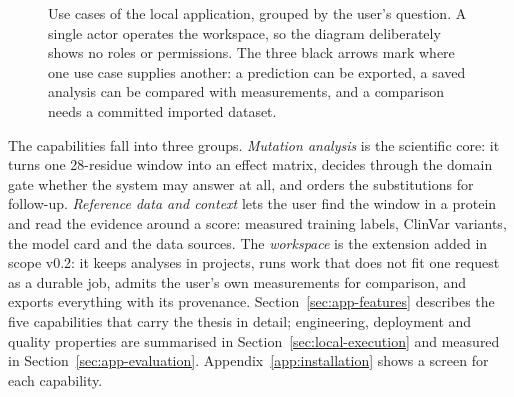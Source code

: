 \begin{figure}[htbp]
  \centering
  
  \caption[Use cases of the local application]{Use cases of the local application, grouped by the user's question. A single actor
  operates the workspace, so the diagram deliberately shows no roles or permissions. The three
  black arrows mark where one use case supplies another: a prediction can be exported, a saved
  analysis can be compared with measurements, and a comparison needs a committed imported dataset.}
  \label{fig:app-usecases}
\end{figure}

The capabilities fall into three groups. \emph{Mutation analysis} is the scientific core: it turns
one 28-residue window into an effect matrix, decides through the domain gate whether the system may
answer at all, and orders the substitutions for follow-up. \emph{Reference data and context} lets the
user find the window in a protein and read the evidence around a score: measured training labels,
ClinVar variants, the model card and the data sources. The \emph{workspace} is the extension added in
scope v0.2: it keeps analyses in projects, runs work that does not fit one request as a durable job,
admits the user's own measurements for comparison, and exports everything with its provenance.
Section~\ref{sec:app-features} describes the five capabilities that carry the thesis in detail;
engineering, deployment and quality properties are summarised in Section~\ref{sec:local-execution}
and measured in Section~\ref{sec:app-evaluation}. Appendix~\ref{app:installation} shows a screen
for each capability.

